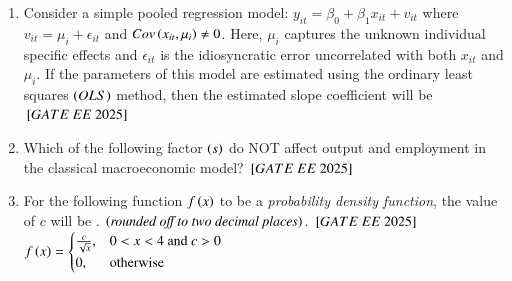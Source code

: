 \documentclass[journal,12pt,onecolumn]{IEEEtran}
\theoremstyle{remark}
\begin{document}
\begin{enumerate}
\item Consider a simple pooled regression model: $y_{it} = \beta_0 + \beta_1 x_{it} + v_{it}$ where $v_{it} = \mu_i + \epsilon_{it}$ and $Cov \left(x_{it},\mu_{i}\right) \neq 0$. Here, $\mu_{i}$ captures the unknown individual specific effects and $\epsilon_{it}$ is the idiosyncratic error uncorrelated with both $x_{it}$ and $\mu_{i}$. If the parameters of this model are estimated using the ordinary least squares  $\left(OLS\right)$ method, then the estimated slope coefficient will be
\hfill $\sbrak{GATE\ EE\ 2025}$
    \begin{enumerate}
      \end{enumerate}
 
\item Which of the following factor $\left(s\right)$ do NOT affect output and employment in the classical macroeconomic model?
\hfill $\sbrak{GATE\ EE\ 2025}$
    \begin{enumerate}
      \end{enumerate}
 
\item For the following function $f \left(x\right)$ to be a \textit{probability density function}, the value of $c$ will be \underline{\hspace{2cm}}.  $\left(\textit{rounded off to two decimal places}\right)$.
\hfill $\sbrak{GATE\ EE\ 2025}$ \\
$
f \left(x\right) =
  \begin{cases}
    \frac{c}{\sqrt{x}}, & 0 < x < 4\text{ and } c > 0 \\
    0, & \text{otherwise}
  \end{cases}$
 

\end{enumerate}
\end{document}
